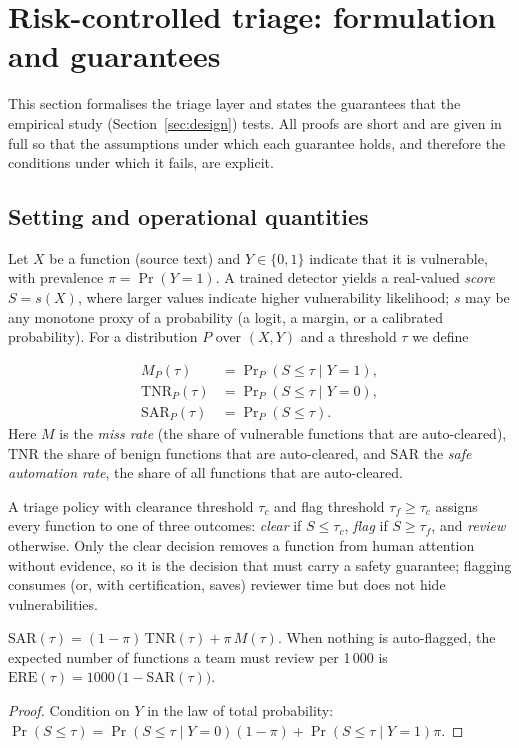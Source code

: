 \section{Risk-controlled triage: formulation and guarantees}\label{sec:method}

This section formalises the triage layer and states the guarantees that the empirical study (Section~\ref{sec:design}) tests.
All proofs are short and are given in full so that the assumptions under which each guarantee holds, and therefore the conditions under which it fails, are explicit.

\subsection{Setting and operational quantities}
Let $X$ be a function (source text) and $Y\in\{0,1\}$ indicate that it is vulnerable, with prevalence $\pi=\Pr(Y=1)$.
A trained detector yields a real-valued \emph{score} $S=s(X)$, where larger values indicate higher vulnerability likelihood; $s$ may be any monotone proxy of a probability (a logit, a margin, or a calibrated probability).
For a distribution $P$ over $(X,Y)$ and a threshold $\tau$ we define

\begin{align}
  M_P(\tau) &= \Pr\nolimits_P\!\left(S\le\tau \mid Y=1\right),\label{eq:miss}\\
  \mathrm{TNR}_P(\tau) &= \Pr\nolimits_P\!\left(S\le\tau \mid Y=0\right),\\
  \mathrm{SAR}_P(\tau) &= \Pr\nolimits_P\!\left(S\le\tau\right).\label{eq:sar}
\end{align}
Here $M$ is the \emph{miss rate} (the share of vulnerable functions that are auto-cleared), $\mathrm{TNR}$ the share of benign functions that are auto-cleared, and $\mathrm{SAR}$ the \emph{safe automation rate}, the share of all functions that are auto-cleared.

A triage policy with clearance threshold $\tau_c$ and flag threshold $\tau_f\ge\tau_c$ assigns every function to one of three outcomes: \emph{clear} if $S\le\tau_c$, \emph{flag} if $S\ge\tau_f$, and \emph{review} otherwise.
Only the clear decision removes a function from human attention without evidence, so it is the decision that must carry a safety guarantee; flagging consumes (or, with certification, saves) reviewer time but does not hide vulnerabilities.

\begin{lemma}\label{lem:sar}
$\mathrm{SAR}(\tau)=(1-\pi)\,\mathrm{TNR}(\tau)+\pi\,M(\tau)$.
When nothing is auto-flagged, the expected number of functions a team must review per 1\,000 is $\mathrm{ERE}(\tau)=1000\,\bigl(1-\mathrm{SAR}(\tau)\bigr)$.
\end{lemma}
\begin{proof}
Condition on $Y$ in the law of total probability: $\Pr(S\le\tau)=\Pr(S\le\tau\mid Y{=}0)(1-\pi)+\Pr(S\le\tau\mid Y{=}1)\pi$.
\end{proof}

